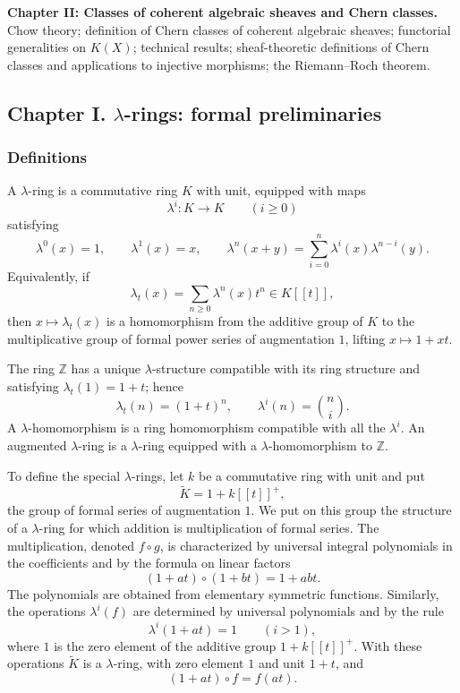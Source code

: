 \documentclass[14pt]{extarticle}
\newcommand{\ZZ}{\mathbb Z}
\begin{document}
\textbf{Chapter II: Classes of coherent algebraic sheaves and Chern classes.} Chow theory; definition of Chern classes of coherent algebraic sheaves; functorial generalities on $K(X)$; technical results; sheaf-theoretic definitions of Chern classes and applications to injective morphisms; the Riemann--Roch theorem.

\subsection{Chapter I. $\lambda$-rings: formal preliminaries}

\subsubsection{Definitions}

A $\lambda$-ring is a commutative ring $K$ with unit, equipped with maps
\[
   \lambda^i:K\to K\qquad (i\geq 0)
\]
satisfying
\begin{equation}\label{eq:lambdarules}
\lambda^0(x)=1,
\qquad \lambda^1(x)=x,
\qquad
\lambda^n(x+y)=\sum_{i=0}^n\lambda^i(x)\lambda^{n-i}(y).
\end{equation}
Equivalently, if
\[
   \lambda_t(x)=\sum_{n\geq 0}\lambda^n(x)t^n\in K[[t]],
\]
then $x\mapsto \lambda_t(x)$ is a homomorphism from the additive group of $K$ to the multiplicative group of formal power series of augmentation $1$, lifting $x\mapsto 1+xt$.

The ring $\ZZ$ has a unique $\lambda$-structure compatible with its ring structure and satisfying $\lambda_t(1)=1+t$; hence
\[
   \lambda_t(n)=(1+t)^n,
   \qquad
   \lambda^i(n)=\binom{n}{i}.
\]
A $\lambda$-homomorphism is a ring homomorphism compatible with all the $\lambda^i$. An augmented $\lambda$-ring is a $\lambda$-ring equipped with a $\lambda$-homomorphism to $\ZZ$.

To define the special $\lambda$-rings, let $k$ be a commutative ring with unit and put
\[
   \widetilde K=1+k[[t]]^+,
\]
the group of formal series of augmentation $1$. We put on this group the structure of a $\lambda$-ring for which addition is multiplication of formal series. The multiplication, denoted $f\circ g$, is characterized by universal integral polynomials in the coefficients and by the formula on linear factors
\begin{equation}\label{eq:circ}
   (1+at)\circ(1+bt)=1+abt.
\end{equation}
The polynomials are obtained from elementary symmetric functions. Similarly, the operations $\lambda^i(f)$ are determined by universal polynomials and by the rule
\[
   \lambda^i(1+at)=1\qquad (i>1),
\]
where $1$ is the zero element of the additive group $1+k[[t]]^+$. With these operations $\widetilde K$ is a $\lambda$-ring, with zero element $1$ and unit $1+t$, and
\begin{equation}\label{eq:linearfactor}
   (1+at)\circ f=f(at).
\end{equation}
\end{document}
